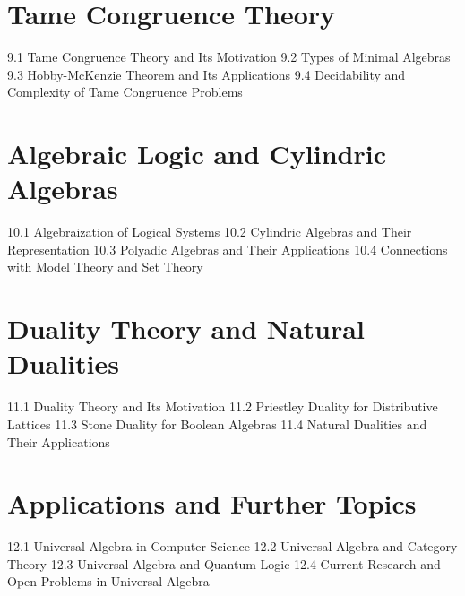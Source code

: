 \section{Tame Congruence Theory}
9.1 Tame Congruence Theory and Its Motivation
9.2 Types of Minimal Algebras
9.3 Hobby-McKenzie Theorem and Its Applications
9.4 Decidability and Complexity of Tame Congruence Problems
\section{Algebraic Logic and Cylindric Algebras}
10.1 Algebraization of Logical Systems
10.2 Cylindric Algebras and Their Representation
10.3 Polyadic Algebras and Their Applications
10.4 Connections with Model Theory and Set Theory
\section{Duality Theory and Natural Dualities}
11.1 Duality Theory and Its Motivation
11.2 Priestley Duality for Distributive Lattices
11.3 Stone Duality for Boolean Algebras
11.4 Natural Dualities and Their Applications
\section{Applications and Further Topics}
12.1 Universal Algebra in Computer Science
12.2 Universal Algebra and Category Theory
12.3 Universal Algebra and Quantum Logic
12.4 Current Research and Open Problems in Universal Algebra
